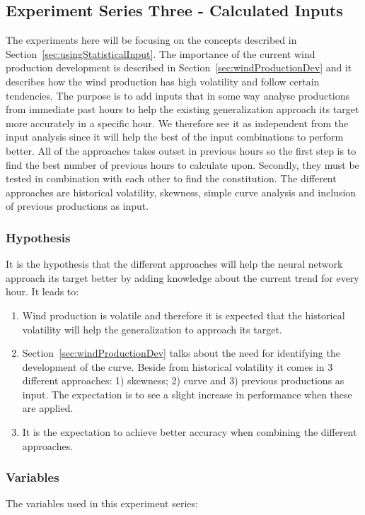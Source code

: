\subsection{Experiment Series Three - Calculated Inputs}
The experiments here will be focusing on the concepts described in Section~\ref{sec:usingStatisticalInput}. The importance of the current wind production development is described in Section~\ref{sec:windProductionDev} and it describes how the wind production has high volatility and follow certain tendencies. The purpose is to add inputs that in some way analyse productions from immediate past hours to help the existing generalization approach its target more accurately in a specific hour. We therefore see it as independent from the input analysis since it will help the best of the input combinations to perform better. All of the approaches takes outset in previous hours so the first step is to find the best number of previous hours to calculate upon. Secondly, they must be tested in combination with each other to find the constitution. The different approaches are historical volatility, skewness, simple curve analysis and inclusion of previous productions as input. 

\subsubsection{Hypothesis} 
It is the hypothesis that the different approaches will help the neural network approach its target better by adding knowledge about the current trend for every hour. It leads to: 

\begin{enumerate}
\item Wind production is volatile and therefore it is expected that the historical volatility will help the generalization to approach its target.
\item Section~\ref{sec:windProductionDev} talks about the need for identifying the development of the curve. Beside from historical volatility it comes in 3 different approaches: 1) skewness; 2) curve and 3) previous productions as input. The expectation is to see a slight increase in performance when these are applied.
\item It is the expectation to achieve better accuracy when combining the different approaches.
\end{enumerate}

\subsubsection{Variables}
The variables used in this experiment series:

